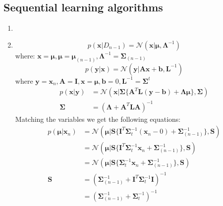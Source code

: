 \documentclass[a4paper,10pt]{article}
\numberwithin{equation}{section} %
\numberwithin{figure}{section} %
\numberwithin{table}{section} %
\theoremstyle{mytheor}
\begin{document}
\subsection{Sequential learning algorithms}
\begin{enumerate}
	\item
	\item \begin{equation}p(\boldsymbol{x} | D_{n-1}) = \mathcal{N}(\boldsymbol{x} | \boldsymbol{\mu}, \boldsymbol{\Lambda}^{-1}) \tag{Bishop 2.113}
		\end{equation}
where: $\boldsymbol{x} = \boldsymbol{\mu}, \boldsymbol{\mu} = \boldsymbol{\mu}_{(n-1)}, \boldsymbol{\Lambda}^{-1} = \boldsymbol{\Sigma}_{(n-1)}$
		\begin{equation}p(\boldsymbol{y} | \boldsymbol{x}) = \mathcal{N}(\boldsymbol{y} | \boldsymbol{Ax} + \boldsymbol{b}, \boldsymbol{L}^{-1}) \tag{Bishop 2.114}
		\end{equation}
where $\boldsymbol{y} = \boldsymbol{x}_n, \boldsymbol{A} = \boldsymbol{I}, \boldsymbol{x} = \boldsymbol{\mu}, \boldsymbol{b} = 0, \boldsymbol{L}^{-1} = \boldsymbol{\Sigma}^t$
		\begin{align} p(\boldsymbol{x} | \boldsymbol y) &= \mathcal{N}(\boldsymbol{x} | \boldsymbol{\Sigma} \{ \boldsymbol{A}^T \boldsymbol{L}(\boldsymbol{y} - \boldsymbol{b}) + \boldsymbol{\Lambda\mu}\}, \boldsymbol{\Sigma}) \tag{Bishop 2.116}\\
	 	\boldsymbol{\Sigma} &= (\boldsymbol{\Lambda} + \boldsymbol{A}^T\boldsymbol{LA})^{-1} \tag{Bishop 2.117}
	 	\end{align}
		Matching the variables we get the following equations:
		\begin{align}
			p(\boldsymbol{\mu} | \boldsymbol{x}_n) &= \mathcal{N}(\boldsymbol{\mu} | \boldsymbol S \{ \boldsymbol{I}^T \boldsymbol{\Sigma}_t^{-1}(\boldsymbol{x}_n - 0) + \boldsymbol{\Sigma}_{(n-1)}^{-1}\}, \boldsymbol S)\\
			&= \mathcal{N}(\boldsymbol{\mu} | \boldsymbol S \{ \boldsymbol{I}^T \boldsymbol{\Sigma}_t^{-1} \boldsymbol{x}_n + \boldsymbol{\Sigma}_{(n-1)}^{-1}\}, \boldsymbol S)\\
			 &= \mathcal{N}(\boldsymbol{\mu} | \boldsymbol S \{ \boldsymbol{\Sigma}_t^{-1} \boldsymbol{x}_n + \boldsymbol{\Sigma}_{(n-1)}^{-1}\}, \boldsymbol S)\\
			\boldsymbol{S} &= (\boldsymbol{\Sigma}_{(n-1)}^{-1} + \boldsymbol{I}^T \boldsymbol{\Sigma}_t^{-1} \boldsymbol{I})^{-1}\\
			&= (\boldsymbol{\Sigma}_{(n-1)}^{-1} + \boldsymbol{\Sigma}_t^{-1})^{-1}

\end{align}
\end{enumerate}
\end{document}
